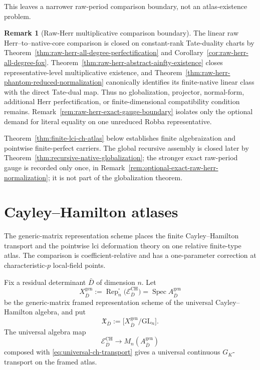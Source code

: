 \documentclass[11pt]{article}
\theoremstyle{definition}
\newtheorem{remark}[theorem]{Remark}
\begin{document}
This leaves a narrower raw-period comparison boundary, not an atlas-existence problem.

\begin{remark}[Raw-Herr multiplicative comparison boundary]\label{rem:ch-kuranishi-boundary}
The linear raw Herr--to--native-core comparison is closed on constant-rank Tate-duality charts by Theorem~\ref{thm:raw-herr-all-degree-perfectification} and Corollary~\ref{cor:raw-herr-all-degree-fox}.  Theorem~\ref{thm:raw-herr-abstract-ainfty-existence} closes representative-level multiplicative existence, and Theorem~\ref{thm:raw-herr-phantom-reduced-normalization} canonically identifies its finite-native linear class with the direct Tate-dual map.  Thus no globalization, projector, normal-form, additional Herr perfectification, or finite-dimensional compatibility condition remains.  Remark~\ref{rem:raw-herr-exact-gauge-boundary} isolates only the optional demand for literal equality on one unreduced Robba representative.
\end{remark}

Theorem~\ref{thm:finite-lci-ch-atlas} below establishes finite algebraization and pointwise finite-perfect carriers.  The global recursive assembly is closed later by Theorem~\ref{thm:recursive-native-globalization}; the stronger exact raw-period gauge is recorded only once, in Remark~\ref{rem:optional-exact-raw-herr-normalization}; it is not part of the globalization theorem.


\section{Cayley--Hamilton atlases}\label{sec:lci-ch-atlas}

The generic-matrix representation scheme places the finite Cayley--Hamilton transport and the pointwise lci deformation theory on one relative finite-type atlas.  The comparison is coefficient-relative and has a one-parameter correction at characteristic-$p$ local-field points.

Fix a residual determinant $\bar D$ of dimension $n$.  Let
\[
X_{\bar D}^{\mathrm{gen}}
:=\operatorname{Rep}^{\square}_n
\bigl(\mathcal E^{\mathrm{CH}}_{\bar D}\bigr)
=\operatorname{Spec}A_{\bar D}^{\mathrm{gen}}
\]
be the generic-matrix framed representation scheme of the universal Cayley--Hamilton algebra, and put
\[
\mathfrak X_{\bar D}
:=\bigl[X_{\bar D}^{\mathrm{gen}}/\mathrm{GL}_n\bigr].
\]
The universal algebra map
\[
\mathcal E^{\mathrm{CH}}_{\bar D}
\longrightarrow M_n(A_{\bar D}^{\mathrm{gen}})
\]
composed with \eqref{eq:universal-ch-transport} gives a universal continuous $G_K$-transport on the framed atlas.
\end{document}
